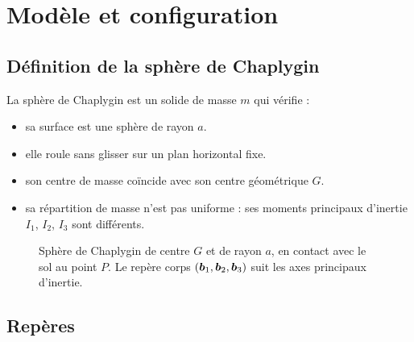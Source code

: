 
\section{Modèle et configuration}

\subsection{Définition de la sphère de Chaplygin}

\begin{hypotheses}
    La sphère de Chaplygin est un solide de masse $m$ qui vérifie :
    \begin{itemize}
        \item sa surface est une sphère de rayon $a$.
        \item elle roule sans glisser sur un plan horizontal fixe.
        \item son centre de masse coïncide avec son centre géométrique
            $G$.
        \item sa répartition de masse n'est pas uniforme : ses moments
            principaux d'inertie $I_1$, $I_2$, $I_3$ sont différents.
    \end{itemize}
\end{hypotheses}

\begin{figure}[H]
    \centering
    
    \caption{Sphère de Chaplygin de centre $G$ et de rayon $a$, en
    contact avec le sol au point $P$. Le repère corps
    $(\bm{b}_1,\bm{b}_2,\bm{b}_3)$ suit les axes principaux
    d'inertie.}
    \label{fig-sphere}
\end{figure}

\subsection{Repères}

